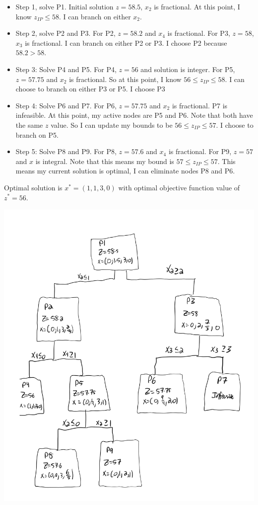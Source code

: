\documentclass[11pt]{article}
\theoremstyle{definition}
\begin{document}
\begin{enumerate}
{\begin{itemize}
\item Step 1, solve P1. Initial solution $z = 58.5$, $x_2$ is fractional. At this point, I know $z_{IP} \leq 58$. I can branch on either $x_2$.
\item Step 2, solve P2 and P3. For P2, $z = 58.2$ and $x_4$ is fractional. For P3, $z = 58$, $x_3$ is fractional. I can branch on either P2 or P3. I choose P2 because $58.2 > 58$.
\item Step 3: Solve P4 and P5. For P4, $z = 56$ and solution is integer. For P5, $ z = 57.75$ and $x_2$ is fractional. So at this point, I know $56 \leq z_{IP} \leq 58$. I can choose to branch on either P3 or P5. I choose P3
\item Step 4: Solve P6 and P7. For P6, $z = 57.75$ and $x_2$ is fractional. P7 is infeasible. At this point, my active nodes are P5 and P6. Note that both have the same $z$ value. So I can update my bounds to be $56 \leq z_{IP} \leq 57$. I choose to branch on P5.
\item Step 5: Solve P8 and P9. For P8, $z = 57.6$ and $x_4$ is fractional. For P9, $z = 57$ and $x$ is integral. Note that this means my bound is $57 \leq z_{IP} \leq 57$. This means my current solution is optimal, I can eliminate nodes P8 and P6.
\end{itemize}

Optimal solution is $x^* = (1,1,3,0)$ with optimal objective function value of $z^* = 56$.


\newpage
\includegraphics[width=\textwidth]{Prob3-Tree.png}
}

\end{enumerate}
\end{document}
